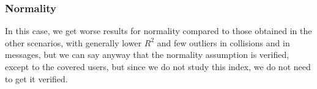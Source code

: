 \subsubsection{Normality}\label{subsubsec:rectassumptionsnormality}

In this case, we get worse results for normality compared to those obtained in
the other scenarios, with generally lower \(R^2\) and few outliers in collisions
and in messages, but we can say anyway that the normality assumption is
verified, except to the covered users, but since we do not study this index, we
do not need to get it verified.
